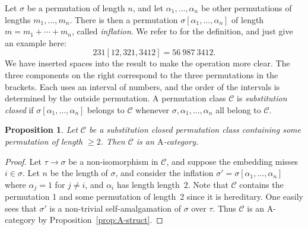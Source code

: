\documentclass[12pt]{amsart}
\numberwithin{equation}{section}
\newtheorem{proposition}[equation]{Proposition}
\theoremstyle{definition}
\newcommand{\rA}{\mathrm{A}}
\newcommand{\cC}{\mathcal{C}}
\newcommand{\defn}[1]{\emph{#1}}
\begin{document}
Let $\sigma$ be a permutation of length $n$, and let $\alpha_1, \ldots, \alpha_n$ be other permutations of lengths $m_1, \ldots, m_n$. There is then a permutation $\sigma[\alpha_1, \ldots, \alpha_n]$ of length $m=m_1+\cdots+m_n$, called \defn{inflation}. We refer to \cite[\S 3.2]{Vatter} for the definition, and just give an example here:
\begin{displaymath}
231[12,321,3412] = 56\ 987\ 3412.
\end{displaymath}
We have inserted spaces into the result to make the operation more clear. The three components on the right correspond to the three permutations in the brackets. Each uses an interval of numbers, and the order of the intervals is determined by the outside permutation. A permutation class $\cC$ is \defn{substitution closed} if $\sigma[\alpha_1, \ldots, \alpha_n]$ belongs to $\cC$ whenever $\sigma,\alpha_1, \ldots, \alpha_n$ all belong to $\cC$.

\begin{proposition}
Let $\cC$ be a substitution closed permutation class containing some permutation of length $\ge 2$. Then $\cC$ is an $\rA$-category.
\end{proposition}

\begin{proof}
Let $\tau \to \sigma$ be a non-isomorphism in $\cC$, and suppose the embedding misses $i \in \sigma$. Let $n$ be the length of $\sigma$, and consider the inflation $\sigma'=\sigma[\alpha_1, \ldots, \alpha_n]$ where $\alpha_j=1$ for $j \ne i$, and $\alpha_i$ has length length~2. Note that $\cC$ contains the permutation 1 and some permutation of length~2 since it is hereditary. One easily sees that $\sigma'$ is a non-trivial self-amalgamation of $\sigma$ over $\tau$. Thus $\cC$ is an $\rA$-category by Proposition~\ref{prop:A-struct}.
\end{proof}
\end{document}
